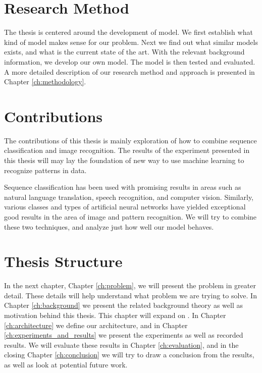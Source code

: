 \section{Research Method}
The thesis is centered around the development of model. We first establish what kind of model makes sense for our problem. Next we find out what similar models exists, and what is the current state of the art. With the relevant background information, we develop our own model. The model is then tested and evaluated. A more detailed description of our research method and approach is presented in Chapter \ref{ch:methodology}.


\section{Contributions}
The contributions of this thesis is mainly exploration of how to combine sequence classification and image recognition. The results of the experiment presented in this thesis will may lay the foundation of new way to use machine learning to recognize patterns in data.

Sequence classification has been used with promising results in areas such as natural language translation, speech recognition, and computer vision. Similarly, various classes and types of artificial neural networks have yielded exceptional good results in the area of image and pattern recognition. We will try to combine these two techniques, and analyze just how well our model behaves.



\section{Thesis Structure}
In the next chapter, Chapter \ref{ch:problem}, we will present the problem in greater detail. These details will help understand what problem we are trying to solve. In Chapter \ref{ch:background} we present the related background theory as well as motivation behind this thesis. This chapter will expand on . In Chapter \ref{ch:architecture} we define our architecture, and in Chapter \ref{ch:experiments_and_results} we present the experiments as well as recorded results. We will evaluate these results in Chapter \ref{ch:evaluation}, and in the closing Chapter \ref{ch:conclusion} we will try to draw a conclusion from the results, as well as look at potential future work.